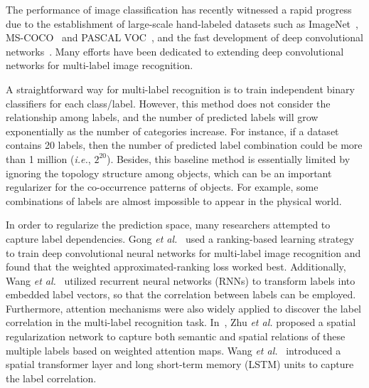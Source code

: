 \documentclass[10pt,twocolumn,letterpaper]{article}
\begin{document}
The performance of image classification has recently witnessed a rapid progress due to the establishment of large-scale hand-labeled datasets such as ImageNet~\cite{imagenet}, MS-COCO~\cite{coco} and PASCAL VOC~\cite{voc}, and the fast development of deep convolutional networks~\cite{resnet,senet,shufflenet,xception,resnext}. Many efforts have been dedicated to extending deep convolutional networks for multi-label image recognition.

A straightforward way for multi-label recognition is to train independent binary classifiers for each class/label. However, this method does not consider the relationship among labels, and the number of predicted labels will grow exponentially as the number of categories increase. For instance, if a dataset contains 20 labels, then the number of predicted label combination could be more than 1 million (\emph{i.e.}, $2^{20}$). Besides, this baseline method is essentially limited by ignoring the topology structure among objects, which can be an important regularizer for the co-occurrence patterns of objects. For example, some combinations of labels are almost impossible to appear in the physical world.



In order to regularize the prediction space, many researchers attempted to capture label dependencies. Gong \emph{et al.}~\cite{warp} used a ranking-based learning strategy to train deep convolutional neural networks for multi-label image recognition and found that the weighted approximated-ranking loss worked best. Additionally, Wang \emph{et al.}~\cite{cnn-rnn} utilized recurrent neural networks (RNNs) to transform labels into embedded label vectors, so that the correlation between labels can be employed. Furthermore, attention mechanisms were also widely applied to discover the label correlation in the multi-label recognition task. In~\cite{srn}, Zhu \emph{et al.} proposed a spatial regularization network to capture both semantic and spatial relations of these multiple labels based on weighted attention maps. Wang \emph{et al.}~\cite{rnn_attention} introduced a spatial transformer layer and long short-term memory (LSTM) units to capture the label correlation.
\end{document}
